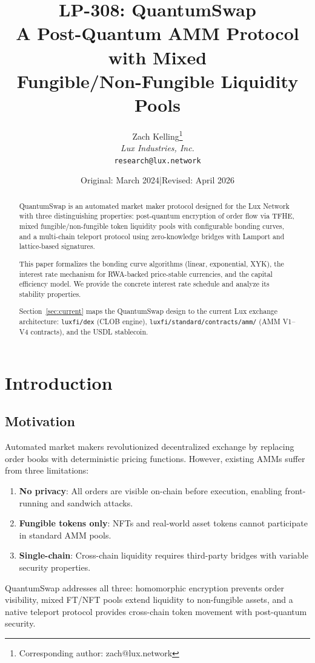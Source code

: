 \documentclass[11pt,a4paper]{article}
\title{LP-308: QuantumSwap\\[4pt]
\large A Post-Quantum AMM Protocol with Mixed\\
Fungible/Non-Fungible Liquidity Pools}
\author{
Zach Kelling\thanks{Corresponding author: zach@lux.network}\\
\textit{Lux Industries, Inc.}\\
\texttt{research@lux.network}
}
\date{Original: March 2024\quad|\quad Revised: April 2026}
\begin{document}
\luxcoverpage

\begin{abstract}
QuantumSwap is an automated market maker protocol designed for the
Lux Network with three distinguishing properties: post-quantum
encryption of order flow via TFHE, mixed fungible/non-fungible token
liquidity pools with configurable bonding curves, and a multi-chain
teleport protocol using zero-knowledge bridges with Lamport and
lattice-based signatures.

This paper formalizes the bonding curve algorithms (linear,
exponential, XYK), the interest rate mechanism for RWA-backed
price-stable currencies, and the capital efficiency model. We provide
the concrete interest rate schedule and analyze its stability
properties.

Section~\ref{sec:current} maps the QuantumSwap design to the current
Lux exchange architecture: \texttt{luxfi/dex} (CLOB engine),
\texttt{luxfi/standard/contracts/amm/} (AMM V1--V4 contracts), and
the USDL stablecoin.
\end{abstract}

\tableofcontents
\newpage

\section{Introduction}

\subsection{Motivation}

Automated market makers revolutionized decentralized exchange by
replacing order books with deterministic pricing functions. However,
existing AMMs suffer from three limitations:

\begin{enumerate}[nosep]
  \item \textbf{No privacy}: All orders are visible on-chain before
        execution, enabling front-running and sandwich attacks.
  \item \textbf{Fungible tokens only}: NFTs and real-world asset tokens
        cannot participate in standard AMM pools.
  \item \textbf{Single-chain}: Cross-chain liquidity requires third-party
        bridges with variable security properties.
\end{enumerate}

QuantumSwap addresses all three: homomorphic encryption prevents order
visibility, mixed FT/NFT pools extend liquidity to non-fungible assets,
and a native teleport protocol provides cross-chain token movement with
post-quantum security.
\end{document}
